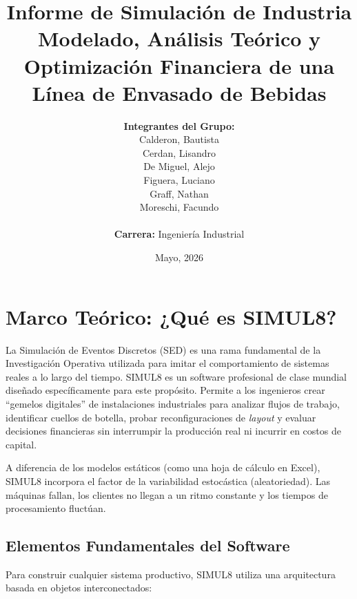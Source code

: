 \documentclass[12pt, a4paper]{article}
\title{
    \vspace{2cm}
    \textbf{\Large Informe de Simulación de Industria} \\
    \vspace{0.5cm}
    \Large Modelado, Análisis Teórico y Optimización Financiera de una Línea de Envasado de Bebidas \\
    \vspace{1.5cm}
}
\author{
    \textbf{Integrantes del Grupo:} \\
    Calderon, Bautista \\
    Cerdan, Lisandro \\
    De Miguel, Alejo \\
    Figuera, Luciano \\
    Graff, Nathan \\
    Moreschi, Facundo \\
    \vspace{1.5cm} \\
    \textbf{Carrera:} Ingeniería Industrial
}
\date{Mayo, 2026}
\begin{document}
\maketitle
\thispagestyle{empty} %
\newpage

\tableofcontents
\newpage


\section{Marco Teórico: ¿Qué es SIMUL8?}
La Simulación de Eventos Discretos (SED) es una rama fundamental de la Investigación Operativa utilizada para imitar el comportamiento de sistemas reales a lo largo del tiempo. SIMUL8 es un software profesional de clase mundial diseñado específicamente para este propósito. Permite a los ingenieros crear ``gemelos digitales'' de instalaciones industriales para analizar flujos de trabajo, identificar cuellos de botella, probar reconfiguraciones de \textit{layout} y evaluar decisiones financieras sin interrumpir la producción real ni incurrir en costos de capital.

A diferencia de los modelos estáticos (como una hoja de cálculo en Excel), SIMUL8 incorpora el factor de la variabilidad estocástica (aleatoriedad). Las máquinas fallan, los clientes no llegan a un ritmo constante y los tiempos de procesamiento fluctúan.

\subsection{Elementos Fundamentales del Software}
Para construir cualquier sistema productivo, SIMUL8 utiliza una arquitectura basada en objetos interconectados:
\end{document}
